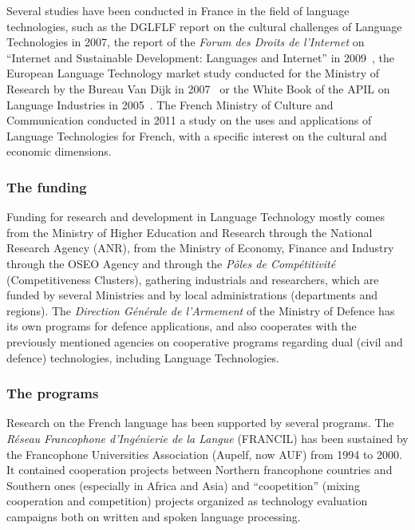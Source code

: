 \begin{multicols}{2}
Several studies have been conducted in France in the field of language
technologies, such as the DGLFLF report on the cultural challenges of
Language Technologies in 2007\cite{dglflf07}, the report of the {\em Forum des Droits de
l'Internet} on ``Internet and Sustainable Development: Languages and Internet'' in 2009~\cite{droitsinternet07}, the
European Language Technology market study conducted for the Ministry
of Research by the Bureau Van Dijk in 2007~\cite{vandijk07} or the White Book of the
APIL on Language Industries in 2005~\cite{apil05}. The French Ministry of Culture
and Communication conducted in 2011 a study on the uses and
applications of Language Technologies for French, with a specific
interest on the cultural and economic dimensions.

\subsubsection{The funding}
Funding for research and development in Language Technology mostly
comes from the Ministry of Higher Education and Research through the
National Research Agency (ANR), from the Ministry of Economy, Finance
and Industry through the OSEO Agency and through the {\em Pôles de
Compétitivité} (Competitiveness Clusters), gathering industrials and
researchers, which are funded by several Ministries and by local
administrations (departments and regions). The {\em Direction Générale de
l'Armement} of the Ministry of Defence has its own programs for defence
applications, and also cooperates with the previously mentioned
agencies on cooperative programs regarding dual (civil and defence)
technologies, including Language Technologies.

\subsubsection{The programs}
Research on the French language has been supported by several
programs. The {\em Réseau Francophone d’Ingénierie de la Langue} (FRANCIL)
has been sustained by the Francophone Universities Association
(Aupelf, now AUF) from 1994 to 2000. It contained cooperation projects
between Northern francophone countries and Southern ones (especially
in Africa and Asia) and ``coopetition'' (mixing cooperation and
competition) projects organized as technology evaluation campaigns
both on written and spoken language processing.


\end{multicols}
